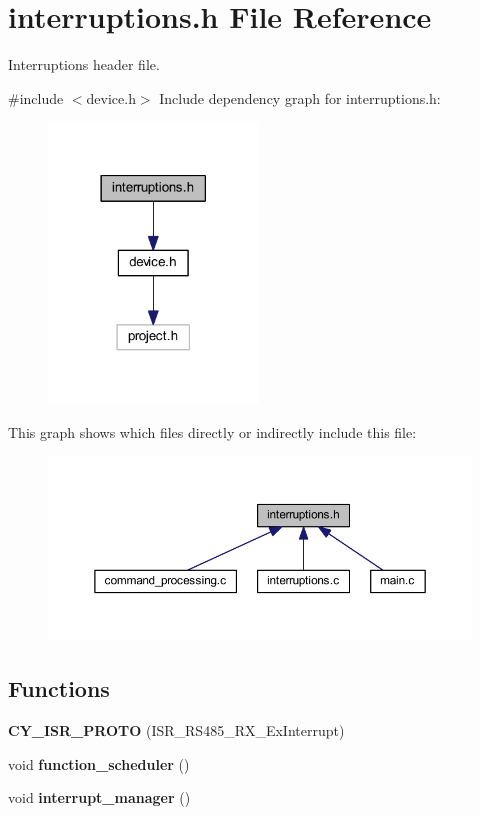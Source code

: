 \section{interruptions.\+h File Reference}
\label{interruptions_8h}


Interruptions header file.  


{\ttfamily \#include $<$device.\+h$>$}\newline
Include dependency graph for interruptions.\+h\+:
\nopagebreak
\begin{figure}[H]
\begin{center}
\leavevmode
\includegraphics[width=158pt]{interruptions_8h__incl}
\end{center}
\end{figure}
This graph shows which files directly or indirectly include this file\+:
\nopagebreak
\begin{figure}[H]
\begin{center}
\leavevmode
\includegraphics[width=350pt]{interruptions_8h__dep__incl}
\end{center}
\end{figure}
\subsection*{Functions}
\begin{DoxyCompactItemize}
\item 
\mbox{\label{interruptions_8h_a7e24af8c83537b0441877bf0f00dd30a}} 
{\bfseries C\+Y\+\_\+\+I\+S\+R\+\_\+\+P\+R\+O\+TO} (I\+S\+R\+\_\+\+R\+S485\+\_\+\+R\+X\+\_\+\+Ex\+Interrupt)
\item 
\mbox{\label{interruptions_8h_a0fe51278c957933282ca63f3ac9beeaf}} 
void {\bfseries function\+\_\+scheduler} ()
\item 
\mbox{\label{interruptions_8h_a9790811526002d99b25a814afd02cbae}} 
void {\bfseries interrupt\+\_\+manager} ()
\end{DoxyCompactItemize}


